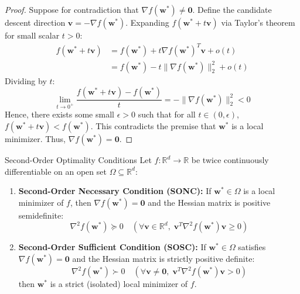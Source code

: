 \begin{proof}
Suppose for contradiction that $\nabla f(\mathbf{w}^*) \ne \mathbf{0}$. Define the candidate descent direction $\mathbf{v} = -\nabla f(\mathbf{w}^*)$. Expanding $f(\mathbf{w}^* + t\mathbf{v})$ via Taylor's theorem for small scalar $t > 0$:
\begin{align}
f(\mathbf{w}^* + t\mathbf{v}) &= f(\mathbf{w}^*) + t \nabla f(\mathbf{w}^*)^T \mathbf{v} + o(t) \nonumber \\
&= f(\mathbf{w}^*) - t \|\nabla f(\mathbf{w}^*)\|_2^2 + o(t)
\end{align}
Dividing by $t$:
\begin{equation}
\lim_{t \to 0^+} \frac{f(\mathbf{w}^* + t\mathbf{v}) - f(\mathbf{w}^*)}{t} = -\|\nabla f(\mathbf{w}^*)\|_2^2 < 0
\end{equation}
Hence, there exists some small $\epsilon > 0$ such that for all $t \in (0, \epsilon)$, $f(\mathbf{w}^* + t\mathbf{v}) < f(\mathbf{w}^*)$. This contradicts the premise that $\mathbf{w}^*$ is a local minimizer. Thus, $\nabla f(\mathbf{w}^*) = \mathbf{0}$.
\end{proof}

\begin{theorembox}{Second-Order Optimality Conditions}
Let $f: \mathbb{R}^d \to \mathbb{R}$ be twice continuously differentiable on an open set $\Omega \subseteq \mathbb{R}^d$:
\begin{enumerate}
    \item \textbf{Second-Order Necessary Condition (SONC):} If $\mathbf{w}^* \in \Omega$ is a local minimizer of $f$, then $\nabla f(\mathbf{w}^*) = \mathbf{0}$ and the Hessian matrix is positive semidefinite:
    \begin{equation}
    \nabla^2 f(\mathbf{w}^*) \succeq 0 \quad (\forall \mathbf{v} \in \mathbb{R}^d, \; \mathbf{v}^T \nabla^2 f(\mathbf{w}^*) \mathbf{v} \ge 0)
    \end{equation}
    \item \textbf{Second-Order Sufficient Condition (SOSC):} If $\mathbf{w}^* \in \Omega$ satisfies $\nabla f(\mathbf{w}^*) = \mathbf{0}$ and the Hessian matrix is strictly positive definite:
    \begin{equation}
    \nabla^2 f(\mathbf{w}^*) \succ 0 \quad (\forall \mathbf{v} \ne \mathbf{0}, \; \mathbf{v}^T \nabla^2 f(\mathbf{w}^*) \mathbf{v} > 0)
    \end{equation}
    then $\mathbf{w}^*$ is a strict (isolated) local minimizer of $f$.
\end{enumerate}
\end{theorembox}


